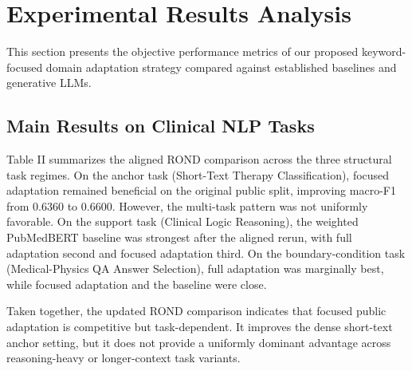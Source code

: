 \documentclass[a4paper,fleqn]{cas-dc}
\begin{document}
\section{Experimental Results Analysis} \label{Experimental Results Analysis}
This section presents the objective performance metrics of our proposed keyword-focused domain adaptation strategy compared against established baselines and generative LLMs.

\subsection{Main Results on Clinical NLP Tasks}
 Table II summarizes the aligned ROND comparison across the three structural task regimes. On the anchor task (Short-Text Therapy Classification), focused adaptation remained beneficial on the original public split, improving macro-F1 from 0.6360 to 0.6600. However, the multi-task pattern was not uniformly favorable. On the support task (Clinical Logic Reasoning), the weighted PubMedBERT baseline was strongest after the aligned rerun, with full adaptation second and focused adaptation third. On the boundary-condition task (Medical-Physics QA Answer Selection), full adaptation was marginally best, while focused adaptation and the baseline were close.
 
 Taken together, the updated ROND comparison indicates that focused public adaptation is competitive but task-dependent. It improves the dense short-text anchor setting, but it does not provide a uniformly dominant advantage across reasoning-heavy or longer-context task variants.
 
 \begin{table}[htbp]
 	\centering
 	\caption{Aligned Main Results Across Structural Boundaries on the ROND Benchmark}
 	\label{tab:main_results}
 \end{table}
\end{document}
